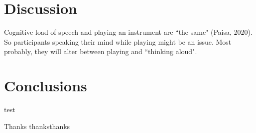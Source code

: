 \documentclass{article}
\begin{document}
\section{Discussion}\label{sec:discussion}
Cognitive load of speech and playing an instrument are ``the same" (Paisa, 2020). So participants speaking their mind while playing might be an issue. Most probably, they will alter between playing and ``thinking aloud". 

\section{Conclusions}
test

\begin{acknowledgments}
Thanks thanksthanks
\end{acknowledgments} 


\end{document}

